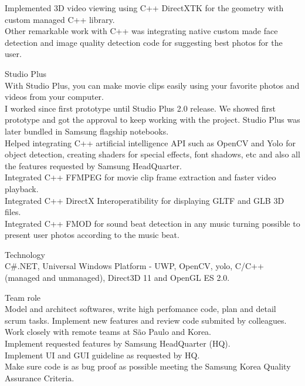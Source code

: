 \begin{cventries}
{\begin{cvitems}
{Implemented 3D video viewing using C++ DirectXTK for the geometry with custom managed C++ library.\\
Other remarkable work with C++ was integrating native custom made face detection and image quality detection code for suggesting best photos for the user.\\}
\item{Studio Plus\\
With Studio Plus, you can make movie clips easily using your favorite photos and videos from your computer.\\
I worked since first prototype until Studio Plus 2.0 release. We showed first prototype and got the approval to keep working with the project. Studio Plus was later bundled in Samsung flagship notebooks.\\
Helped integrating C++ artificial intelligence API such as OpenCV and Yolo for object detection, creating shaders for special effects, font shadows, etc and also all the features requested by Samsung HeadQuarter.\\
Integrated C++ FFMPEG for movie clip frame extraction and faster video playback.\\
Integrated C++ DirectX Interoperatibility for displaying GLTF and GLB 3D files.\\
Integrated C++ FMOD for sound beat detection in any music turning possible to present user photos according to the music beat.\\
}
\item{Technology\\C\#.NET, Universal Windows Platform - UWP, OpenCV, yolo, C/C++ (managed and unmanaged), Direct3D 11 and OpenGL ES 2.0.\\}
\item{Team role\\Model and architect softwares, write high perfomance code, plan and detail scrum tasks. Implement new features and review code submited by colleagues.\\
Work closely with remote teams at São Paulo and Korea. \\
Implement requested features by Samsung HeadQuarter (HQ). \\
Implement UI and GUI guideline as requested by HQ.\\
Make sure code is as bug proof as possible meeting the Samsung Korea Quality Assurance Criteria.}
      \end{cvitems}
    }


\end{cventries}
